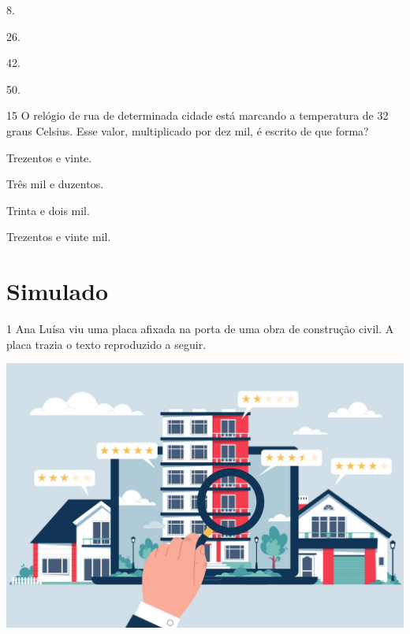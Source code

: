 \begin{escolha}
\item
  8.
\item
  26.
\item
  42.
\item
  50.
\end{escolha}


\num{15} O relógio de rua de determinada cidade está marcando a temperatura
de 32 graus Celsius. Esse valor, multiplicado por dez mil, é escrito de que forma?

\begin{escolha}
\item Trezentos e vinte.
\item Três mil e duzentos.
\item Trinta e dois mil.
\item Trezentos e vinte mil.
\end{escolha}
\pagebreak

\chapter[Simulado 4]{Simulado}

\num{1} Ana Luísa viu uma placa afixada na porta de uma obra de construção civil. A placa trazia o texto reproduzido a seguir.

\begin{center}
\includegraphics[width=\textwidth]{media/image86a.jpeg}
\end{center}\enlargethispage{2\baselineskip}

